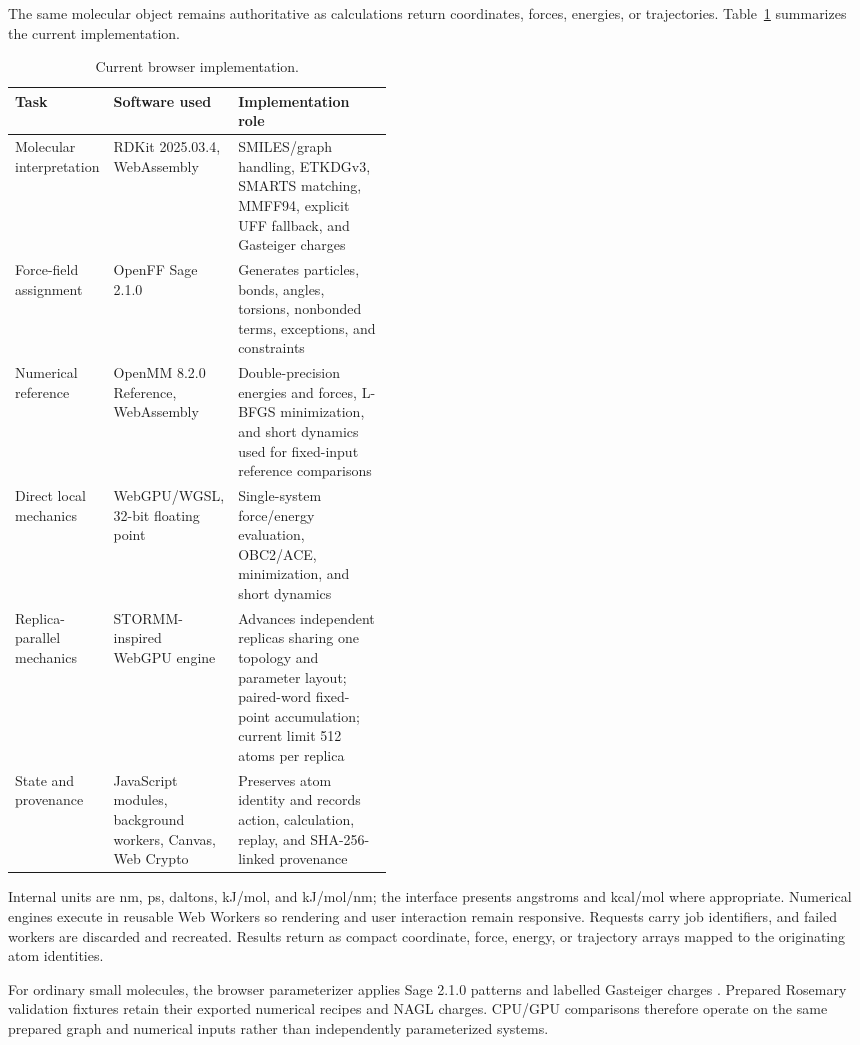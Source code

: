 \documentclass[11pt]{article}
\begin{document}
\begin{small}
The same molecular object remains authoritative as calculations return coordinates, forces, energies, or trajectories. Table~\ref{tab:appA_browser_impl} summarizes the current implementation.

\begin{table}[htbp]
\centering\small
\caption{Current browser implementation.}
\label{tab:appA_browser_impl}
\begin{tabularx}{\linewidth}{@{}p{0.20\linewidth}p{0.24\linewidth}X@{}}
\toprule
\textbf{Task} & \textbf{Software used} & \textbf{Implementation role}\\
\midrule
Molecular interpretation & RDKit 2025.03.4, WebAssembly & SMILES/graph handling, ETKDGv3, SMARTS matching, MMFF94, explicit UFF fallback, and Gasteiger charges\\
Force-field assignment & OpenFF Sage 2.1.0 & Generates particles, bonds, angles, torsions, nonbonded terms, exceptions, and constraints\\
Numerical reference & OpenMM 8.2.0 Reference, WebAssembly & Double-precision energies and forces, L-BFGS minimization, and short dynamics used for fixed-input reference comparisons\\
Direct local mechanics & WebGPU/WGSL, 32-bit floating point & Single-system force/energy evaluation, OBC2/ACE, minimization, and short dynamics\\
Replica-parallel mechanics & STORMM-inspired WebGPU engine & Advances independent replicas sharing one topology and parameter layout; paired-word fixed-point accumulation; current limit 512 atoms per replica\\
State and provenance & JavaScript modules, background workers, Canvas, Web Crypto & Preserves atom identity and records action, calculation, replay, and SHA-256-linked provenance\\
\bottomrule
\end{tabularx}
\end{table}

Internal units are nm, ps, daltons, kJ/mol, and kJ/mol/nm; the interface presents angstroms and kcal/mol where appropriate. Numerical engines execute in reusable Web Workers so rendering and user interaction remain responsive. Requests carry job identifiers, and failed workers are discarded and recreated. Results return as compact coordinate, force, energy, or trajectory arrays mapped to the originating atom identities.

For ordinary small molecules, the browser parameterizer applies Sage 2.1.0 patterns and labelled Gasteiger charges \citep{boothroyd2023sage,gasteiger1980charges}. Prepared Rosemary validation fixtures retain their exported numerical recipes and NAGL charges. CPU/GPU comparisons therefore operate on the same prepared graph and numerical inputs rather than independently parameterized systems.


\end{small}
\end{document}
